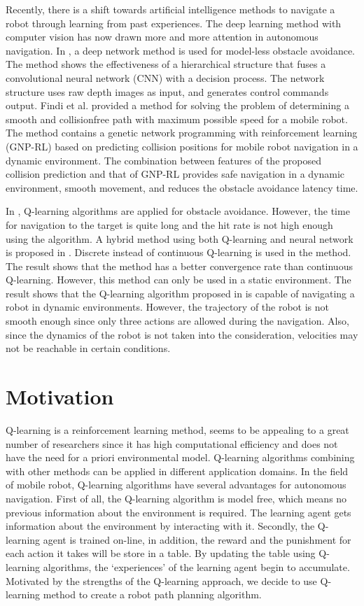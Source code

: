 \documentclass{acmtog} %
\begin{document}
Recently, there is a shift towards artificial intelligence methods to navigate a robot through
learning from past experiences. The deep learning method with computer vision has now drawn more and more attention in autonomous navigation. In \cite{deeplearning}, a deep network method is used for model-less obstacle avoidance. The method shows the effectiveness
of a hierarchical structure that fuses a convolutional neural network (CNN) with a decision process.
The network structure uses raw depth images as input, and generates control commands output.
Findi et al. \cite{gnt} provided a method for solving the problem of determining a smooth and collisionfree
path with maximum possible speed for a mobile robot. The method contains a genetic network
programming with reinforcement learning (GNP-RL) based on predicting collision positions for
mobile robot navigation in a dynamic environment. The combination between features of the proposed
collision prediction and that of GNP-RL provides safe navigation in a dynamic environment, smooth
movement, and reduces the obstacle avoidance latency time.

In \cite{erl}, Q-learning algorithms are applied for obstacle avoidance. However, the
time for navigation to the target is quite long and the hit rate is not high enough using the algorithm.
A hybrid method using both Q-learning and neural network is proposed in \cite{arl}. Discrete instead
of continuous Q-learning is used in the method.  The result shows that the method has a better convergence rate
than continuous Q-learning. However, this method can only be used in a static environment.  The result shows that the Q-learning algorithm proposed in \cite{rbm} is capable of navigating a robot in dynamic environments. However, the trajectory of the robot is not smooth
enough since only three actions are allowed during the navigation. Also, since the dynamics of the
robot is not taken into the consideration, velocities may not be reachable in certain conditions.

\section{Motivation}
Q-learning is a reinforcement learning method, seems to be appealing to a great number of researchers
since it has high computational efficiency and does not have the need for a priori environmental model.
Q-learning algorithms combining with other methods can be applied in different application domains. In the field of mobile robot, Q-learning
algorithms have several advantages for autonomous navigation. First of all, the Q-learning algorithm
is model free, which means no previous information about the environment is required. The learning
agent gets information about the environment by interacting with it. Secondly, the Q-learning agent
is trained on-line, in addition, the reward and the punishment for each action it takes will be store in a
table. By updating the table using Q-learning algorithms, the ‘experiences’ of the learning agent begin
to accumulate. Motivated by the strengths of the Q-learning approach, we decide to use Q-learning method to create a robot path planning algorithm.
\end{document}
